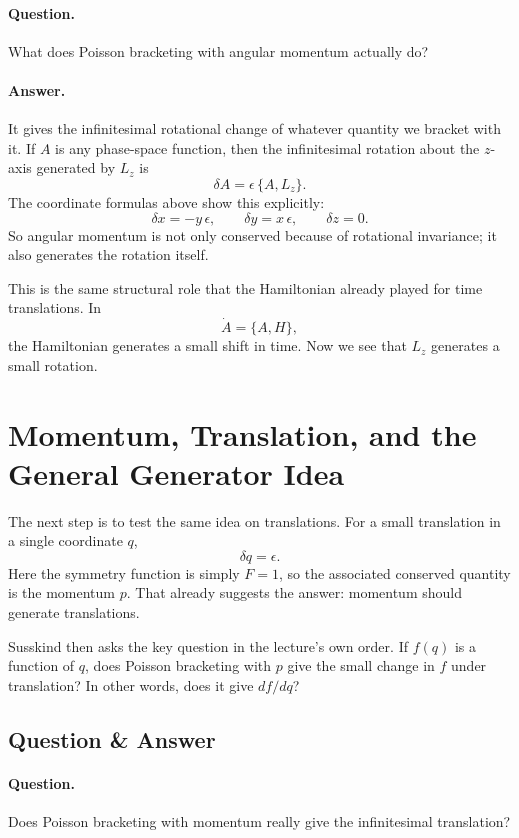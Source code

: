 \paragraph{Question.} What does Poisson bracketing with angular momentum actually do?

\paragraph{Answer.} It gives the infinitesimal rotational change of whatever quantity we bracket with it. If \(A\) is any phase-space function, then the infinitesimal rotation about the \(z\)-axis generated by \(L_z\) is
\begin{equation}
\delta A=\epsilon\,\{A,L_z\}.
\end{equation}
The coordinate formulas above show this explicitly:
\[
\delta x=-y\,\epsilon,\qquad \delta y=x\,\epsilon,\qquad \delta z=0.
\]
So angular momentum is not only conserved because of rotational invariance; it also generates the rotation itself.

This is the same structural role that the Hamiltonian already played for time translations. In
\[
\dot A=\{A,H\},
\]
the Hamiltonian generates a small shift in time. Now we see that \(L_z\) generates a small rotation.

\section{Momentum, Translation, and the General Generator Idea}

The next step is to test the same idea on translations. For a small translation in a single coordinate \(q\),
\begin{equation}
\delta q=\epsilon.
\end{equation}
Here the symmetry function is simply \(F=1\), so the associated conserved quantity is the momentum \(p\). That already suggests the answer: momentum should generate translations.

Susskind then asks the key question in the lecture's own order. If \(f(q)\) is a function of \(q\), does Poisson bracketing with \(p\) give the small change in \(f\) under translation? In other words, does it give \(df/dq\)?

\subsection{Question \& Answer}

\paragraph{Question.} Does Poisson bracketing with momentum really give the infinitesimal translation?

